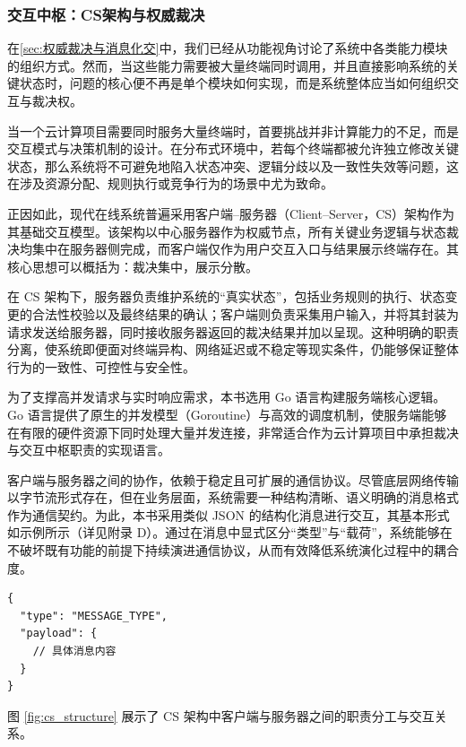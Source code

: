 \subsubsection{交互中枢：CS架构与权威裁决}\label{subsubsec:cs_arch}

在\ref{sec:权威裁决与消息化交}中，我们已经从功能视角讨论了系统中各类能力模块的组织方式。然而，当这些能力需要被大量终端同时调用，并且直接影响系统的关键状态时，问题的核心便不再是单个模块如何实现，而是系统整体应当如何组织交互与裁决权。

当一个云计算项目需要同时服务大量终端时，首要挑战并非计算能力的不足，而是交互模式与决策机制的设计。在分布式环境中，若每个终端都被允许独立修改关键状态，那么系统将不可避免地陷入状态冲突、逻辑分歧以及一致性失效等问题，这在涉及资源分配、规则执行或竞争行为的场景中尤为致命。

正因如此，现代在线系统普遍采用客户端–服务器（Client–Server，CS）架构作为其基础交互模型。该架构以中心服务器作为权威节点，所有关键业务逻辑与状态裁决均集中在服务器侧完成，而客户端仅作为用户交互入口与结果展示终端存在。其核心思想可以概括为：裁决集中，展示分散。

在 CS 架构下，服务器负责维护系统的“真实状态”，包括业务规则的执行、状态变更的合法性校验以及最终结果的确认；客户端则负责采集用户输入，并将其封装为请求发送给服务器，同时接收服务器返回的裁决结果并加以呈现。这种明确的职责分离，使系统即便面对终端异构、网络延迟或不稳定等现实条件，仍能够保证整体行为的一致性、可控性与安全性。

为了支撑高并发请求与实时响应需求，本书选用 Go 语言构建服务端核心逻辑。Go 语言提供了原生的并发模型（Goroutine）与高效的调度机制，使服务端能够在有限的硬件资源下同时处理大量并发连接，非常适合作为云计算项目中承担裁决与交互中枢职责的实现语言。

客户端与服务器之间的协作，依赖于稳定且可扩展的通信协议。尽管底层网络传输以字节流形式存在，但在业务层面，系统需要一种结构清晰、语义明确的消息格式作为通信契约。为此，本书采用类似 JSON 的结构化消息进行交互，其基本形式如示例所示（详见附录 D）。通过在消息中显式区分“类型”与“载荷”，系统能够在不破坏既有功能的前提下持续演进通信协议，从而有效降低系统演化过程中的耦合度。

\begin{tcolorbox}[title=统一消息格式]
\begin{verbatim}
{
  "type": "MESSAGE_TYPE",
  "payload": {
    // 具体消息内容
  }
}
\end{verbatim}
\end{tcolorbox}

图 \ref{fig:cs_structure} 展示了 CS 架构中客户端与服务器之间的职责分工与交互关系。

